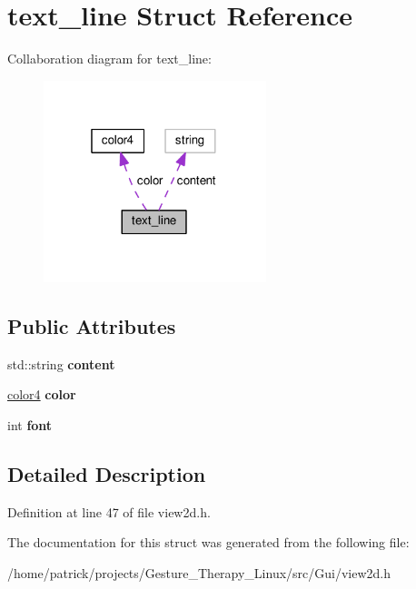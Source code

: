 \hypertarget{structtext__line}{}\section{text\+\_\+line Struct Reference}
\label{structtext__line}


Collaboration diagram for text\+\_\+line\+:\nopagebreak
\begin{figure}[H]
\begin{center}
\leavevmode
\includegraphics[width=184pt]{structtext__line__coll__graph}
\end{center}
\end{figure}
\subsection*{Public Attributes}
\begin{DoxyCompactItemize}
\item 
\mbox{\label{structtext__line_a18dcfcf72d9d30948fcbf87ad75bb4aa}} 
std\+::string {\bfseries content}
\item 
\mbox{\label{structtext__line_ab60461c6c7f60e66ca1bb276b2e06ad7}} 
\hyperlink{structcolor4}{color4} {\bfseries color}
\item 
\mbox{\label{structtext__line_ace02e72ff836ff8c47f87a6c374ed72a}} 
int {\bfseries font}
\end{DoxyCompactItemize}


\subsection{Detailed Description}


Definition at line 47 of file view2d.\+h.



The documentation for this struct was generated from the following file\+:\begin{DoxyCompactItemize}
\item 
/home/patrick/projects/\+Gesture\+\_\+\+Therapy\+\_\+\+Linux/src/\+Gui/view2d.\+h\end{DoxyCompactItemize}
